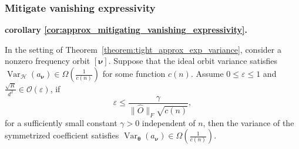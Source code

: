 \documentclass[%
 reprint,
 amsmath,amssymb,
 aps,
 pra,
]{revtex4-2}
\theoremstyle{definition}
\newenvironment{restate}[2]{%
  \par\noindent\textbf{#1 \ref{#2}. }\itshape%
}{\par\medskip}
\begin{document}
\subsubsection{Mitigate vanishing expressivity}
\label{app:approx_mitigating_vanishing_expressivity}
\begin{restate}{corollary}{cor:approx_mitigating_vanishing_expressivity}
In the setting of Theorem~\ref{theorem:tight_approx_exp_variance}, consider a nonzero frequency orbit
\([\bm{\nu}]\). Suppose that the ideal orbit variance satisfies $ \operatorname{Var}_{\mathcal H}(a_{\bm{\nu}}) \in    \Omega\!\left(\frac{1}{c(n)}\right)$ for some function \(c(n)\). Assume \(0\le \varepsilon\le 1\) and $\frac{\sqrt R}{d^2} \in \mathcal O(\varepsilon)$, if
\begin{equation}
    \varepsilon
    \le
    \frac{\gamma}{\|\hat O\|_F\sqrt{c(n)}},
\end{equation}
for a sufficiently small constant \(\gamma>0\) independent of \(n\), then the variance of the symmetrized coefficient satisfies $ \operatorname{Var}_{\bm{\theta}}(a_{\bm{\nu}})  \in    \Omega\!\left(\frac{1}{c(n)}\right)$.
\end{restate}
\end{document}
